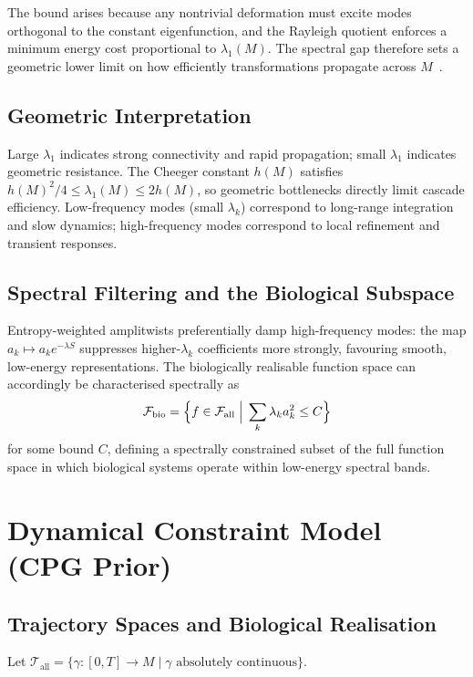 \documentclass[12pt, a4paper]{article}
\theoremstyle{remark}
\theoremstyle{definition}
\begin{document}
The bound arises because any nontrivial deformation must excite modes orthogonal to the
constant eigenfunction, and the Rayleigh quotient enforces a minimum energy cost
proportional to $\lambda_1(M)$.  The spectral gap therefore sets a geometric lower limit
on how efficiently transformations propagate across $M$~\cite{cheeger1970lower}.

\subsection{Geometric Interpretation}

Large $\lambda_1$ indicates strong connectivity and rapid propagation; small $\lambda_1$
indicates geometric resistance.  The Cheeger constant $h(M)$ satisfies
$h(M)^2/4 \le \lambda_1(M) \le 2h(M)$, so geometric bottlenecks directly limit cascade
efficiency.  Low-frequency modes (small $\lambda_k$) correspond to long-range integration
and slow dynamics; high-frequency modes correspond to local refinement and transient
responses.

\subsection{Spectral Filtering and the Biological Subspace}

Entropy-weighted amplitwists preferentially damp high-frequency modes: the map
$a_k \mapsto a_k e^{-\lambda S}$ suppresses higher-$\lambda_k$ coefficients more
strongly, favouring smooth, low-energy representations.  The biologically realisable
function space can accordingly be characterised spectrally as
\[
\mathcal{F}_{\mathrm{bio}}
= \Bigl\{f \in \mathcal{F}_{\mathrm{all}} \;\Big|\; \sum_k \lambda_k a_k^2 \le C\Bigr\}
\]
for some bound $C$, defining a spectrally constrained subset of the full function space in
which biological systems operate within low-energy spectral bands.

\section{Dynamical Constraint Model (CPG Prior)}
\label{app:cpg}

\subsection{Trajectory Spaces and Biological Realisation}

Let $\mathcal{T}_{\mathrm{all}} = \{\gamma\colon [0,T] \to M \mid \gamma \text{ absolutely
continuous}\}$.
\end{document}
